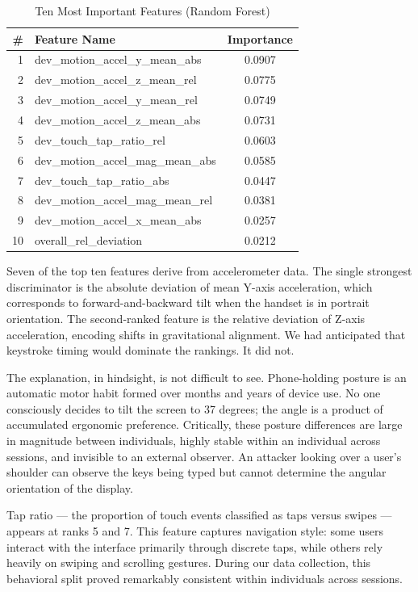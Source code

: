 \documentclass[conference]{IEEEtran}
\begin{document}
\begin{table}[htbp]
\caption{Ten Most Important Features (Random Forest)}
\label{tab:feature_importance}
\centering
\small
\begin{tabular}{r l c}
\toprule
\textbf{\#} & \textbf{Feature Name} & \textbf{Importance} \\
\midrule
1 & dev\_motion\_accel\_y\_mean\_abs & 0.0907 \\
2 & dev\_motion\_accel\_z\_mean\_rel & 0.0775 \\
3 & dev\_motion\_accel\_y\_mean\_rel & 0.0749 \\
4 & dev\_motion\_accel\_z\_mean\_abs & 0.0731 \\
5 & dev\_touch\_tap\_ratio\_rel & 0.0603 \\
6 & dev\_motion\_accel\_mag\_mean\_abs & 0.0585 \\
7 & dev\_touch\_tap\_ratio\_abs & 0.0447 \\
8 & dev\_motion\_accel\_mag\_mean\_rel & 0.0381 \\
9 & dev\_motion\_accel\_x\_mean\_abs & 0.0257 \\
10 & overall\_rel\_deviation & 0.0212 \\
\bottomrule
\end{tabular}
\end{table}

Seven of the top ten features derive from accelerometer data. The single strongest discriminator is the absolute deviation of mean Y-axis acceleration, which corresponds to forward-and-backward tilt when the handset is in portrait orientation. The second-ranked feature is the relative deviation of Z-axis acceleration, encoding shifts in gravitational alignment. We had anticipated that keystroke timing would dominate the rankings. It did not.

The explanation, in hindsight, is not difficult to see. Phone-holding posture is an automatic motor habit formed over months and years of device use. No one consciously decides to tilt the screen to 37 degrees; the angle is a product of accumulated ergonomic preference. Critically, these posture differences are large in magnitude between individuals, highly stable within an individual across sessions, and invisible to an external observer. An attacker looking over a user's shoulder can observe the keys being typed but cannot determine the angular orientation of the display.

Tap ratio --- the proportion of touch events classified as taps versus swipes --- appears at ranks 5 and 7. This feature captures navigation style: some users interact with the interface primarily through discrete taps, while others rely heavily on swiping and scrolling gestures. During our data collection, this behavioral split proved remarkably consistent within individuals across sessions.
\end{document}
